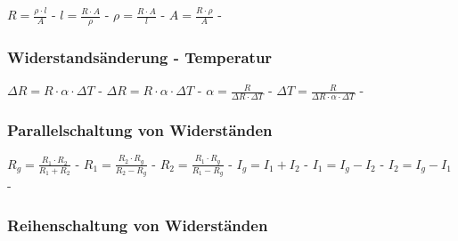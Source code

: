 $ R = \frac{\rho \cdot l}{ A} $ - $ l = \frac{R\cdot A}{ \rho } $ - $ \rho  = \frac{R\cdot A}{ l} $ - $ A = \frac{R\cdot \rho }{ A} $ - \\ 
 
\subsubsection{Widerstandsänderung - Temperatur} 
\begin{minipage}{0.45\textwidth} 
\end{minipage} 
\begin{minipage}{0.45\textwidth} 
 
\legende{}\end{minipage} 
 
$ \Delta R = R\cdot \alpha \cdot \Delta T $ - $ \Delta R = R\cdot \alpha \cdot \Delta T $ - $ \alpha  = \frac{R}{\Delta R\cdot \Delta T} $ - $ \Delta T = \frac{   R}{\Delta R\cdot \alpha \cdot \Delta T} $ - \\ 
 
\subsubsection{Parallelschaltung von Widerständen} 
\begin{minipage}{0.45\textwidth} 
\end{minipage} 
\begin{minipage}{0.45\textwidth} 
 
\legende{}\end{minipage} 
 
$ R_{g}  = \frac{R_{1} \cdot R_{2} }{R_{1} +R_{2} } $ - $ R_{1}  = \frac{R_{2} \cdot R_{g} }{R_{2} -R_{g} } $ - $ R_{2}  = \frac{R_{1} \cdot R_{g} }{R_{1} -R_{g} } $ - $ I_{g}  = I_{1}  + I_{2} $ - $ I_{1}  = I_{g}  - I_{2} $ - $ I_{2}  = I_{g}  - I_{1} $ - \\ 
 
\subsubsection{Reihenschaltung von Widerständen} 
\begin{minipage}{0.45\textwidth} 
\end{minipage} 
\begin{minipage}{0.45\textwidth} 
 
\legende{}\end{minipage} 
 
